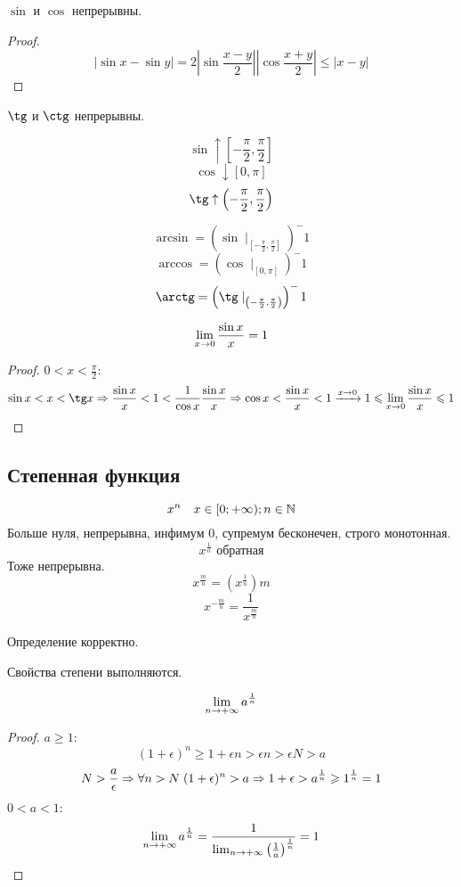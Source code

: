 \begin{conseq}
$\sin$ и $\cos$ непрерывны. 
\end{conseq}
\begin{proof}
$$\left|\sin x - \sin y\right| = 2 \left|\sin \frac{x-y}2\right| \left|\cos \frac{x+y}2\right| \leqslant \left|x - y\right|$$
\end{proof}

\begin{conseq}
$\tg$ и $\ctg$ непрерывны. 
\end{conseq}

\begin{conseq}
$$\sin \uparrow   \left[-\frac\pi2,\frac\pi2\right]$$
$$\cos \downarrow \left[0,\pi\right]$$
$$\tg  \uparrow   \left(-\frac\pi2,\frac\pi2\right)$$
\end{conseq}

\begin{Def}
$$ \arcsin = \left(\sin \mid_{\left[-\frac\pi2,\frac\pi2\right]}\right)^-1 $$
$$ \arccos = \left(\cos \mid_{\left[0,\pi\right]}\right)^-1 $$
$$ \arctg  = \left(\tg  \mid_{\left(-\frac\pi2,\frac\pi2\right)}\right)^-1 $$
\end{Def}

\begin{theorem}{}
$$\lim_{x \rightarrow 0} \frac{\sin x}x = 1$$
\end{theorem}
\begin{proof}
$0 < x < \frac\pi2$:
$$\sin x < x < \tg x \Ra \frac{\sin x}x < 1 < \frac1{\cos x} \frac{\sin x}x \Ra \cos x < \frac{\sin x}x < 1 \xra{x\ra0} 1 \leqslant \lim_{x\ra0} \frac{\sin x}x \leqslant 1$$
\end{proof}

\subsection{Степенная функция}
$$x^n \quad x \in [0;+\infty); n \in \mathbb{N}$$
Больше нуля, непрерывна, инфимум 0, супремум бесконечен, строго монотонная.
$$x^\frac1n\text{ обратная}$$
Тоже непрерывна.
$$x^{\frac{m}n} = \left(x^\frac1n\right)m$$
$$x^{-\frac{m}n}=\frac1{x^{\frac{m}n}}$$

\begin{assertion}
Определение корректно.
\end{assertion}
\begin{assertion}
Свойства степени выполняются.
\end{assertion}

\begin{lemma}
$$\lim_{n\rightarrow+\infty} a^{\frac1n}$$
\end{lemma}
\begin{proof}
$a \geqslant 1$:
$$(1+\epsilon)^n \geqslant 1 + \epsilon n > \epsilon n > \epsilon N > a$$
$$N > \frac{a}\epsilon \Rightarrow \forall n > N\; (1+\epsilon)^n > a \Rightarrow 1 + \epsilon > a^{\frac1n} \geqslant 1^{\frac1n} = 1$$
$0 < a < 1$:
$$\lim_{n\rightarrow+\infty} a^{\frac1n} = \frac1{\lim_{n\rightarrow+\infty} \left(\frac1a\right)^{\frac1n}} = 1$$
\end{proof}

